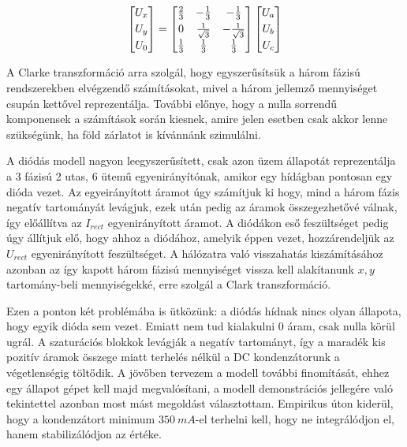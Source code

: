 \begin{equation}
\centering
\begin{bmatrix}
       U_x\\[0.3em]
       U_y\\[0.3em]
       U_0 
\end{bmatrix}
=
\begin{bmatrix}
       \frac{2}{3} & -\frac{1}{3} & -\frac{1}{3}  \\[0.3em]
       0 & \frac{1}{\sqrt{3}} & -\frac{1}{\sqrt{3}}  \\[0.3em]
       \frac{1}{3} & \frac{1}{3} & \frac{1}{3}    
\end{bmatrix}
\begin{bmatrix}
       U_a\\[0.3em]
       U_b\\[0.3em]
       U_c    
\end{bmatrix}
\end{equation}

A Clarke transzformáció arra szolgál, hogy egyszerűsítsük a három fázisú rendszerekben elvégzendő számításokat, mivel a három jellemző mennyiséget csupán kettővel reprezentálja. További előnye, hogy a nulla sorrendű komponensek a számítások során kiesnek, amire jelen esetben csak akkor lenne szükségünk, ha föld zárlatot is kívánnánk szimulálni.

A diódás modell nagyon leegyszerűsített, csak azon üzem állapotát reprezentálja a 3 fázisú 2 utas, 6 ütemű egyenirányítónak, amikor egy hídágban pontosan egy dióda vezet. Az egyeirányított áramot úgy számítjuk ki hogy, mind a három fázis negatív tartományát levágjuk, ezek után pedig az áramok összegezhetővé válnak, így előállítva az $I_{rect}$ egyenirányított áramot. A diódákon eső feszültséget pedig úgy állítjuk elő, hogy ahhoz a diódához, amelyik éppen vezet, hozzárendeljük az $U_{rect}$ egyenirányított feszültséget. A hálózatra való visszahatás kiszámításához azonban az így kapott három fázisú mennyiséget vissza kell alakítanunk $x,y$ tartomány-beli mennyiségekké, erre szolgál a Clark transzformáció.

Ezen a ponton két problémába is ütközünk: a diódás hídnak nincs olyan állapota, hogy egyik dióda sem vezet. Emiatt nem tud kialakulni 0 áram, csak nulla körül ugrál. A szaturációs blokkok levágják a negatív tartományt, így a maradék kis pozitív áramok összege miatt terhelés nélkül a DC kondenzátorunk a végetlenségig töltődik. A jövőben tervezem a modell további finomítását, ehhez egy állapot gépet kell majd megvalósítani, a modell demonstrációs jellegére való tekintettel azonban most mást megoldást választottam. Empirikus úton kiderül, hogy a kondenzátort minimum $350\ mA$-el terhelni kell, hogy ne integrálódjon el, hanem stabilizálódjon az értéke.

